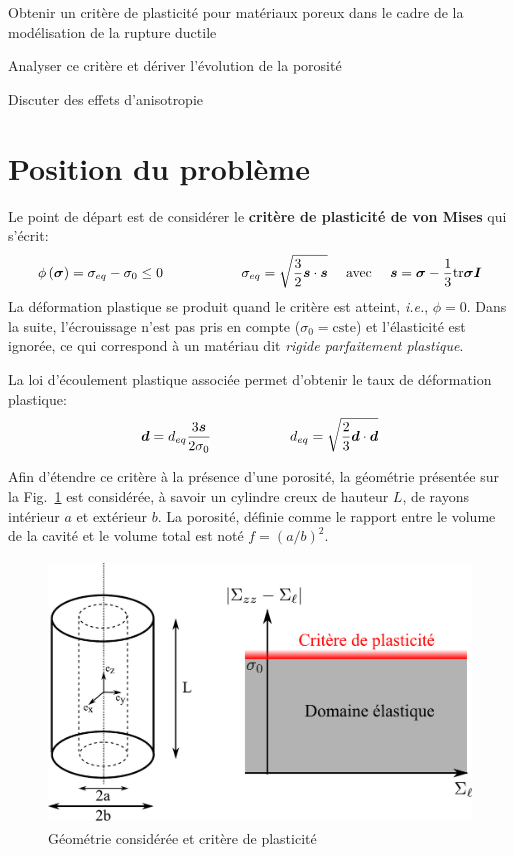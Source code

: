 \documentclass[french,12pt]{exam}
\begin{document}
\thispagestyle{empty}

\begin{objectifs}
\item Obtenir un critère de plasticité pour matériaux poreux dans le cadre de la modélisation de la rupture ductile
\item Analyser ce critère et dériver l'évolution de la porosité
\item Discuter des effets d'anisotropie
\end{objectifs}

\section{Position du problème}
Le point de départ est de considérer le \textbf{critère de plasticité de von Mises} qui s'écrit:
\begin{equation}
  \phi\left( \boldsymbol{\sigma}   \right) =  \sigma_{eq} - \sigma_0 \leq 0 \hspace{2cm} \sigma_{eq} = \sqrt{\frac{3}{2} \boldsymbol{s} \cdot \boldsymbol{s}} \ \ \ \ \mathrm{avec} \ \ \ \ \boldsymbol{s} = \boldsymbol{\sigma} - \frac{1}{3} \mathrm{tr}\boldsymbol{\sigma} \boldsymbol{I}
  \label{eq1}
\end{equation}
La déformation plastique se produit quand le critère est atteint, \textit{i.e.}, $\phi = 0$. Dans la suite, l'écrouissage n'est pas pris en compte ($\sigma_0 = \text{cste}$) et l'élasticité est ignorée, ce qui correspond à un matériau dit \textit{rigide parfaitement plastique}.

La loi d'écoulement plastique associée permet d'obtenir le taux de déformation plastique:
\begin{equation}
  \boldsymbol{d} = d_{eq} \frac{3 \boldsymbol{s}}{2 \sigma_0}  \hspace{2cm} d_{eq} = \sqrt{\frac{2}{3}\boldsymbol{d} \cdot \boldsymbol{d} }
  \label{eq200}
\end{equation}

Afin d'étendre ce critère à la présence d'une porosité, la géométrie présentée sur la Fig.~\ref{fig1} est considérée, à savoir un cylindre creux de hauteur $L$, de rayons intérieur $a$ et extérieur $b$. La porosité, définie comme le rapport entre le volume de la cavité et le volume total est noté $f = (a/b)^2$.
\begin{figure}[H]
  \centering
  \includegraphics[height = 7cm]{homoMEALOR.pdf}
\caption{Géométrie considérée et critère de plasticité}
\label{fig1}
\end{figure}
\end{document}
